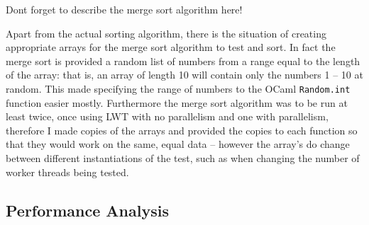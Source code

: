 \documentclass[12pt,twoside,notitlepage]{report}
\begin{document}
Dont forget to describe the merge sort algorithm here!

Apart from the actual sorting algorithm, there is the situation of creating appropriate arrays for the merge sort algorithm to test and sort. In fact the merge sort is provided a random list of numbers from a range equal to the length
of the array: that is, an array of length 10 will contain only the numbers 1 -- 10 at random. This made specifying the range of numbers to the OCaml {\tt Random.int} function easier mostly. Furthermore the merge sort algorithm was to
be run at least twice, once using LWT with no parallelism and one with parallelism, therefore I made copies of the arrays and provided the copies to each function so that they would work on the same, equal data -- however the array's
do change between different instantiations of the test, such as when changing the number of worker threads being tested.

\subsection{Performance Analysis}
\end{document}
